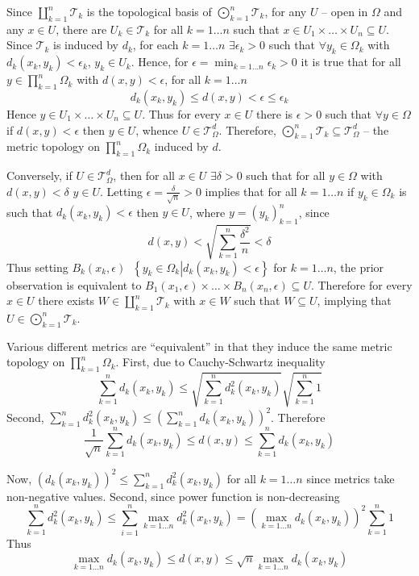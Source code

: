 \documentclass[a4paper]{article}
\newcommand{\obj}[1]{\left\{ #1 \right \}}
\newcommand{\brac}[1]{\left ( #1 \right )}
\newcommand{\induc}[1]{\left . #1 \right \vert}
\newcommand{\Tcal}{\mathcal{T}}
\newcommand{\defn}{\mathop{\overset{\Delta}{=}}\nolimits}
\begin{document}
Since $\coprod_{k=1}^n \Tcal_k$ is the topological basis of $\bigodot_{k=1}^n \Tcal_k$, for any $U$ -- open in $\Omega$ and any $x\in U$, there are $U_k\in \Tcal_k$ for all $k=1\ldots n$ such that $x\in U_1\times \ldots \times U_n\subseteq U$. Since $\Tcal_k$ is induced by $d_k$, for each $k=1\ldots n$ $\exists \epsilon_k>0$ such that $\forall y_k\in \Omega_k$ with $d_k\brac{x_k, y_k} < \epsilon_k$, $y_k\in U_k$. Hence, for $\epsilon = \min_{k=1\ldots n} \epsilon_k > 0$ it is true that for all $y\in \prod_{k=1}^n \Omega_k$ with $d\brac{x, y} < \epsilon$, for all $k=1\ldots n$ \[d_k\brac{x_k, y_k} \leq d\brac{x, y} < \epsilon \leq \epsilon_k\] Hence $y\in U_1\times \ldots \times U_n\subseteq U$. Thus for every $x\in U$ there is $\epsilon>0$ such that $\forall y\in \Omega$ if $d\brac{x,y} < \epsilon$ then $y\in U$, whence $U\in \Tcal_\Omega^d$. Therefore, $\bigodot_{k=1}^n \Tcal_k \subseteq \Tcal_\Omega^d$ -- the metric topology on $\prod_{k=1}^n \Omega_k$ induced by $d$.

Conversely, if $U\in \Tcal_\Omega^d$, then for all $x\in U$ $\exists \delta>0$ such that for all $y\in \Omega$ with $d\brac{x,y}<\delta$ $y\in U$. Letting $\epsilon = \frac{\delta}{\sqrt{n}}>0$ implies that for all $k=1\ldots n$ if $y_k\in \Omega_k$ is such that $d_k\brac{x_k, y_k} < \epsilon$ then $y\in U$, where $y=\brac{y_k}_{k=1}^n$, since \[d\brac{x,y} < \sqrt{ \sum_{k=1}^n \frac{\delta^2}{n} } < \delta\] Thus setting $B_k\brac{x_k, \epsilon}\defn \obj{ \induc{ y_k\in \Omega_k } d_k\brac{ x_k, y_k } < \epsilon }$ for $k=1\ldots n$, the prior observation is equivalent to $B_1\brac{x_1, \epsilon}\times\ldots \times B_n\brac{x_n, \epsilon} \subseteq U$. Therefore for every $x\in U$ there exists $W\in \coprod_{k=1}^n \Tcal_k$ with $x\in W$ such that $W\subseteq U$, implying that $U\in \bigodot_{k=1}^n \Tcal_k$.

Various different metrics are ``equivalent'' in that they induce the same metric topology on $\prod_{k=1}^n \Omega_k$. First, due to Cauchy-Schwartz inequality \[\sum_{k=1}^n d_k\brac{ x_k, y_k } \leq \sqrt{ \sum_{k=1}^n d^2_k\brac{ x_k, y_k } } \sqrt{ \sum_{k=1}^n 1 }\] Second, $\sum_{k=1}^n d^2_k\brac{ x_k, y_k } \leq \brac{ \sum_{k=1}^n d_k\brac{ x_k, y_k } }^2$. Therefore \[\frac{1}{\sqrt{n}} \sum_{k=1}^n d_k\brac{ x_k, y_k }\leq d\brac{ x, y }\leq \sum_{k=1}^n d_k\brac{ x_k, y_k }\]

Now, $\brac{d_k\brac{ x_k, y_k }}^2 \leq \sum_{k=1}^n d^2_k\brac{ x_k, y_k }$ for all $k=1\ldots n$ since metrics take non-negative values. Second, since power function is non-decreasing \[\sum_{k=1}^n d^2_k\brac{ x_k, y_k }\leq \sum_{i=1}^n \max_{k=1\ldots n} d^2_k\brac{ x_k, y_k } = \brac{ \max_{k=1\ldots n} d_k\brac{ x_k, y_k } }^2 \sum_{k=1}^n 1 \] Thus \[\max_{k=1\ldots n} d_k\brac{ x_k, y_k }\leq d\brac{x, y}\leq \sqrt{n} \max_{k=1\ldots n} d_k\brac{ x_k, y_k }\]\\
\end{document}
